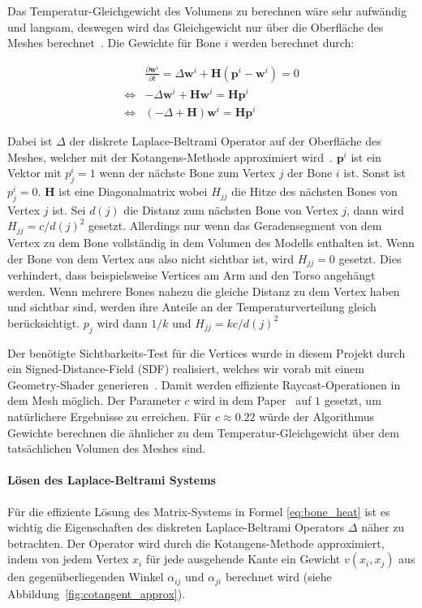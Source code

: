 Das Temperatur-Gleichgewicht des Volumens zu berechnen wäre sehr aufwändig und langsam, deswegen wird das Gleichgewicht nur über die Oberfläche des Meshes berechnet~\cite[S.~6]{bone_heat_paper}. Die Gewichte für Bone $i$ werden berechnet durch:

\begin{equation}
\label{eq:bone_heat}
\begin{aligned}
&\frac{\partial\mathbf{w}^i}{\partial t} = \Delta\mathbf{w}^i+\mathbf{H}\left(\mathbf{p}^i-\mathbf{w}^i\right)=0 \\
\iff &-\Delta\mathbf{w}^i+\mathbf{H}\mathbf{w}^i=\mathbf{H}\mathbf{p}^i \\
\iff &\left(-\Delta+\mathbf{H}\right)\mathbf{w}^i=\mathbf{H}\mathbf{p}^i
\end{aligned}
\end{equation}

Dabei ist $\Delta$ der diskrete Laplace-Beltrami Operator auf der Oberfläche des Meshes, welcher mit der Kotangens-Methode approximiert wird~\cite{laplace_beltrami_paper}. $\mathbf{p}^i$ ist ein Vektor mit $p^i_j=1$ wenn der nächste Bone zum Vertex $j$ der Bone $i$ ist. Sonst ist $p^i_j=0$. $\mathbf{H}$ ist eine Diagonalmatrix wobei $H_{jj}$ die Hitze des nächsten Bones von Vertex $j$ ist. Sei $d(j)$ die Distanz zum nächsten Bone von Vertex $j$, dann wird $H_{jj}=c/d(j)^2$ gesetzt. Allerdings nur wenn das Geradensegment von dem Vertex zu dem Bone vollständig in dem Volumen des Modells enthalten ist. Wenn der Bone von dem Vertex aus also nicht sichtbar ist, wird $H_{jj}=0$ gesetzt. Dies verhindert, dass beispielsweise Vertices am Arm and den Torso angehängt werden. Wenn mehrere Bones nahezu die gleiche Distanz zu dem Vertex haben und sichtbar sind, werden ihre Anteile an der Temperaturverteilung gleich berücksichtigt. $p_j$ wird dann $1/k$ und $H_{jj} = kc/d(j)^2$

Der benötigte Sichtbarkeits-Test für die Vertices wurde in diesem Projekt durch ein Signed-Distance-Field (SDF) realisiert, welches wir vorab mit einem Geometry-Shader generieren~\cite{signed_distance_field}. Damit werden effiziente Raycast-Operationen in dem Mesh möglich.
Der Parameter $c$ wird in dem Paper~\cite{bone_heat_paper} auf $1$ gesetzt, um natürlichere Ergebnisse zu erreichen. Für $c\approx0.22$ würde der Algorithmus Gewichte berechnen die ähnlicher zu dem Temperatur-Gleichgewicht über dem tatsächlichen Volumen des Meshes sind.

\paragraph{Lösen des Laplace-Beltrami Systems}
Für die effiziente Lösung des Matrix-Systems in Formel \ref{eq:bone_heat} ist es wichtig die Eigenschaften des diskreten Laplace-Beltrami Operators $\Delta$ näher zu betrachten. Der Operator wird durch die Kotangens-Methode approximiert, indem von jedem Vertex $x_i$ für jede ausgehende Kante ein Gewicht $v(x_i,x_j)$ aus den gegenüberliegenden Winkel $\alpha_{ij}$ und $\alpha_{ji}$ berechnet wird (siehe Abbildung~\ref{fig:cotangent_approx}).

